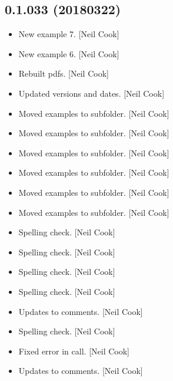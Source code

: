 \documentclass[a4paper,10pt,english]{report}
\begin{document}
\subsection{0.1.033 (2018\sphinxhyphen{}03\sphinxhyphen{}22)}
\label{\detokenize{misc/changelog:id490}}\begin{itemize}
\item {} 
New example 7. {[}Neil Cook{]}

\item {} 
New example 6. {[}Neil Cook{]}

\item {} 
Rebuilt pdfs. {[}Neil Cook{]}

\item {} 
Updated versions and dates. {[}Neil Cook{]}

\item {} 
Moved examples to subfolder. {[}Neil Cook{]}

\item {} 
Moved examples to subfolder. {[}Neil Cook{]}

\item {} 
Moved examples to subfolder. {[}Neil Cook{]}

\item {} 
Moved examples to subfolder. {[}Neil Cook{]}

\item {} 
Moved examples to subfolder. {[}Neil Cook{]}

\item {} 
Moved examples to subfolder. {[}Neil Cook{]}

\item {} 
Spelling check. {[}Neil Cook{]}

\item {} 
Spelling check. {[}Neil Cook{]}

\item {} 
Spelling check. {[}Neil Cook{]}

\item {} 
Spelling check. {[}Neil Cook{]}

\item {} 
Updates to comments. {[}Neil Cook{]}

\item {} 
Spelling check. {[}Neil Cook{]}

\item {} 
Fixed error in call. {[}Neil Cook{]}

\item {} 
Updates to comments. {[}Neil Cook{]}


\end{itemize}
\end{document}
